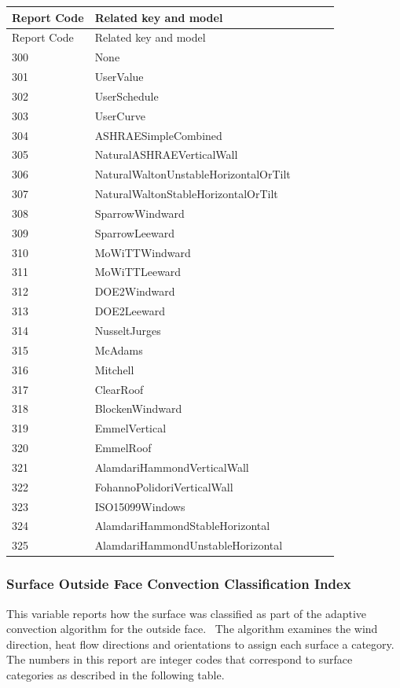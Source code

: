 \begin{longtable}[c]{@{}ll@{}}
\toprule 
Report Code & Related key and model \tabularnewline
\midrule
\endfirsthead

\toprule 
Report Code & Related key and model \tabularnewline
\midrule
\endhead

300 & None~ \tabularnewline
301 & UserValue \tabularnewline
302 & UserSchedule \tabularnewline
303 & UserCurve~~~~~~~~~~~~~~~~~~~~~~~~~~~~~~ \tabularnewline
304 & ASHRAESimpleCombined~~~~~~~~~~~~~~~~~~~ \tabularnewline
305 & NaturalASHRAEVerticalWall~~~~~~~~~~~~~~ \tabularnewline
306 & NaturalWaltonUnstableHorizontalOrTilt~~ \tabularnewline
307 & NaturalWaltonStableHorizontalOrTilt~~~~ \tabularnewline
308 & SparrowWindward~~~~~~~~~~~~~~~~~~~~~~~~ \tabularnewline
309 & SparrowLeeward~~~~~~~~~~~~~~~~~~~~~~~~~ \tabularnewline
310 & MoWiTTWindward~~~~~~~~~~~~~~~~~~~~~~~~~ \tabularnewline
311 & MoWiTTLeeward~~~~~~~~~~~~~~~~~~~~~~~~~~ \tabularnewline
312 & DOE2Windward~~~~~~~~~~~~~~~~~~~~~~~~~~~ \tabularnewline
313 & DOE2Leeward~~~~~~~~~~~~~~~~~~~~~~~~~~~~ \tabularnewline
314 & NusseltJurges~~~~~~~~~~~~~~~~~~~~~~~~~~ \tabularnewline
315 & McAdams~~~~~~~~~~~~~~~~~~~~~~~~~~~~~~~~ \tabularnewline
316 & Mitchell~~~~~~~~~~~~~~~~~~~~~~~~~~~~~~~ \tabularnewline
317 & ClearRoof~~~~~~~~~~~~~~~~~~~~~~~~~~~~~~ \tabularnewline
318 & BlockenWindward~~~~~~~~~~~~~~~~~~~~~~~~ \tabularnewline
319 & EmmelVertical~~~~~~~~~~~~ ~~~~~~~~~~~~~~ \tabularnewline
320 & EmmelRoof~~~~~~~~~~~~~~~~~~~~~~~~~~~~~~ \tabularnewline
321 & AlamdariHammondVerticalWall~~~~~~~~~~~~ \tabularnewline
322 & FohannoPolidoriVerticalWall~~~~~~~~~~~~ \tabularnewline
323 & ISO15099Windows~~~~~~~~~~~~~~~~~~~~~~~~ \tabularnewline
324 & AlamdariHammondStableHorizontal~~~~~~~~ \tabularnewline
325 & AlamdariHammondUnstableHorizontal~~~~~~ \tabularnewline
\bottomrule
\end{longtable}

\subsubsection{Surface Outside Face Convection Classification Index}\label{surface-outside-face-convection-classification-index}

This variable reports how the surface was classified as part of the adaptive convection algorithm for the outside face.~ The algorithm examines the wind direction, heat flow directions and orientations to assign each surface a category.~ The numbers in this report are integer codes that correspond to surface categories as described in the following table.


